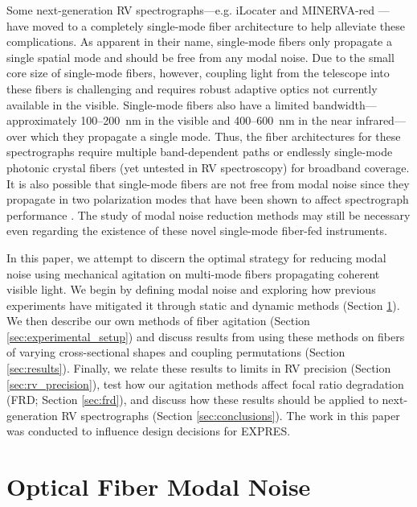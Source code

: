 Some next-generation RV spectrographs---e.g. iLocater \citep{crepp_ilocater_2016} and MINERVA-red \citep{blake_minerva-red_2015}---have moved to a completely single-mode fiber architecture to help alleviate these complications. As apparent in their name, single-mode fibers only propagate a single spatial mode and should be free from any modal noise. Due to the small core size of single-mode fibers, however, coupling light from the telescope into these fibers is challenging and requires robust adaptive optics not currently available in the visible. Single-mode fibers also have a limited bandwidth---approximately 100--\SI{200}{\nano\meter} in the visible and 400--\SI{600}{\nano\meter} in the near infrared---over which they propagate a single mode. Thus, the fiber architectures for these spectrographs require multiple band-dependent paths or endlessly single-mode photonic crystal fibers (yet untested in RV spectroscopy) for broadband coverage. It is also possible that single-mode fibers are not free from modal noise since they propagate in two polarization modes that have been shown to affect spectrograph performance \citep{halverson_modal_2015}. The study of modal noise reduction methods may still be necessary even regarding the existence of these novel single-mode fiber-fed instruments.

In this paper, we attempt to discern the optimal strategy for reducing modal noise using mechanical agitation on multi-mode fibers propagating coherent visible light. We begin by defining modal noise and exploring how previous experiments have mitigated it through static and dynamic methods (Section \ref{sec:modal_noise_intro}). We then describe our own methods of fiber agitation (Section \ref{sec:experimental_setup}) and discuss results from using these methods on fibers of varying cross-sectional shapes and coupling permutations (Section \ref{sec:results}). Finally, we relate these results to limits in RV precision (Section \ref{sec:rv_precision}), test how our agitation methods affect focal ratio degradation (FRD; Section {\ref{sec:frd}}), and discuss how these results should be applied to next-generation RV spectrographs (Section \ref{sec:conclusions}). The work in this paper was conducted to influence design decisions for EXPRES.

\section{Optical Fiber Modal Noise}
\label{sec:modal_noise_intro}

